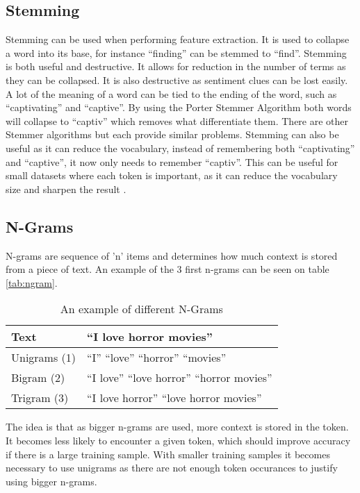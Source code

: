 \subsection{Stemming}\label{subsec:Stem}
Stemming can be used when performing feature extraction. It is used to collapse
a word into its base, for instance ``finding'' can be stemmed to ``find''.
Stemming is both useful and destructive. It allows for reduction in the number
of terms as they can be collapsed. It is also destructive as sentiment clues
can be lost easily. A lot of the meaning of a word can be tied to the ending of
the word, such as ``captivating'' and ``captive''. By using the Porter Stemmer
Algorithm both words will collapse to ``captiv'' which removes what
differentiate them. There are other Stemmer algorithms but each provide similar
problems. Stemming can also be useful as it can reduce the vocabulary, instead
of remembering both ``captivating'' and ``captive'', it now only needs to
remember ``captiv''. This can be useful for small datasets where each token is
important, as it can reduce the vocabulary size and sharpen the result
\citep[Ch 3.b]{Sentiment}.

\subsection{N-Grams}
N-grams are sequence of 'n' items and determines how much context is stored
from a piece of text. An example of the 3 first n-grams can be seen on table
\autoref{tab:ngram}. 

\begin{table}[H]
\centering
\begin{tabular}{|l|l|}
\hline
Text & ``I love horror movies'' \\ \hline
Unigrams (1) &
``I'' ``love'' ``horror'' ``movies''
\\ \hline 
Bigram (2) &
``I love'' ``love horror'' ``horror movies''
\\ \hline
Trigram (3) &
``I love horror'' ``love horror movies''
\\ \hline
\end{tabular}
\caption{An example of different N-Grams}
\label{tab:ngram}
\end{table}

The idea is that as bigger n-grams are used, more context is stored in the
token. It becomes less likely to encounter a given token, which should
improve accuracy if there is a large training sample. With smaller training
samples it becomes necessary to use unigrams as there are not enough
token occurances to justify using bigger n-grams.

